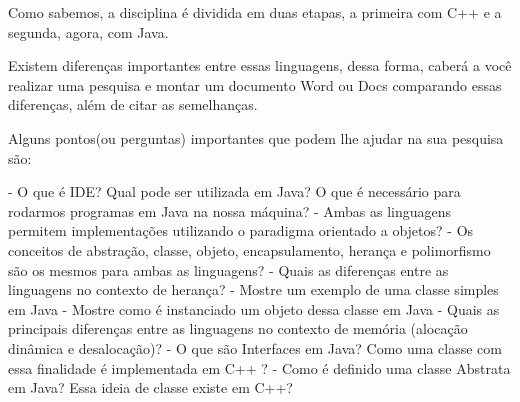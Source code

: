 Como sabemos, a disciplina é dividida em duas etapas, a primeira com C++ e a segunda, agora, com Java.

Existem diferenças importantes entre essas linguagens, dessa forma, caberá a você realizar uma pesquisa e montar um documento Word ou Docs comparando essas diferenças, além de citar as semelhanças.

Alguns pontos(ou perguntas) importantes que podem lhe ajudar na sua pesquisa são:

- O que é IDE? Qual pode ser utilizada em Java? O que é necessário para rodarmos programas em Java na nossa máquina?
- Ambas as linguagens permitem implementações utilizando o paradigma orientado a objetos?
- Os conceitos de abstração, classe, objeto, encapsulamento, herança e polimorfismo são os mesmos para ambas as linguagens?
- Quais as diferenças entre as linguagens no contexto de herança?
- Mostre um exemplo de uma classe simples em Java
- Mostre como é instanciado um objeto dessa classe em Java
- Quais as principais diferenças entre as linguagens no contexto de memória (alocação dinâmica e desalocação)?
- O que são Interfaces em Java? Como uma classe com essa finalidade é implementada em C++ ?
- Como é definido uma classe Abstrata em Java? Essa ideia de classe existe em C++?